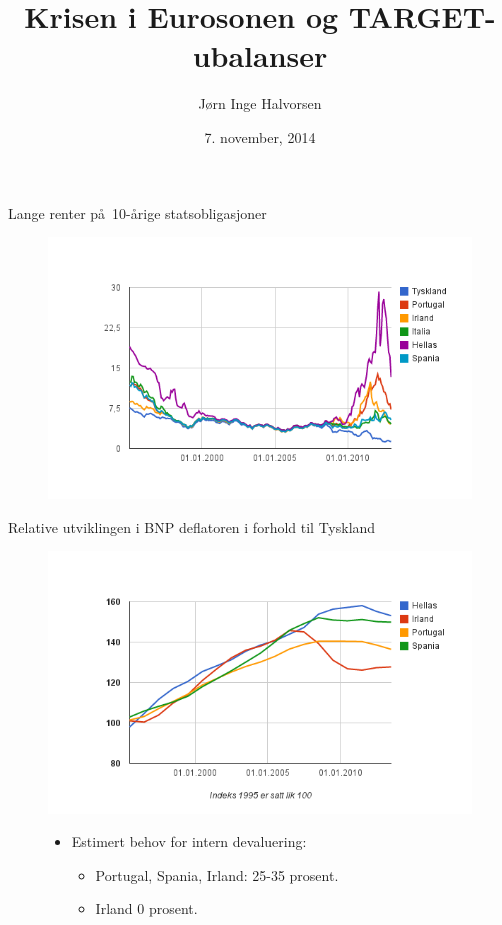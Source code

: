 \documentclass[notes=show notes]{beamer}
\begin{document}
\author[]{J\o rn Inge Halvorsen }
\title[]{Krisen i Eurosonen og TARGET-ubalanser}
\date[]{7. november, 2014}
\maketitle	
\begin{frame}{Lange renter p\aa \  10-\aa rige statsobligasjoner}
\begin{figure}
\centering
\includegraphics[width=0.9\linewidth]{Fig2_Lange_Renter_G}
\label{fig:Fig2_Lange_Renter_G}
\end{figure}
\end{frame}
\begin{frame}{Relative utviklingen i BNP deflatoren i forhold til Tyskland}
\begin{figure}
\centering
\includegraphics[width=0.80\linewidth]{Fig3_bnp_deflator_g}
\begin{itemize}
\item Estimert behov for intern devaluering:
\begin{itemize}
	\item Portugal, Spania, Irland: 25-35 prosent. 
	\item Irland 0 prosent. 
\end{itemize} 
\end{itemize}
\label{fig:Fig3_bnp_deflator_g}
\end{figure}
\end{frame}	
\end{document}
